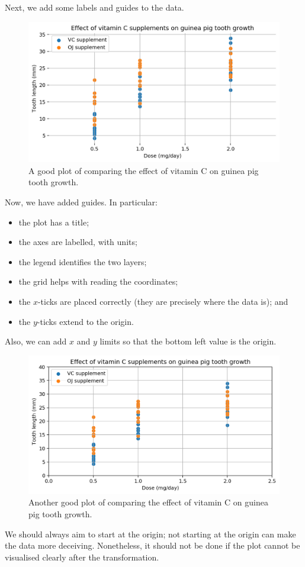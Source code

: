 \documentclass[a4paper, openany]{memoir}
\begin{document}
Next, we add some labels and guides to the data.
\begin{figure}[H]
    \centering
    \includegraphics[scale=0.5]{src/2.13 VitC Example Plot 3.png}
    \caption{A good plot of comparing the effect of vitamin C on guinea pig tooth growth.}
\end{figure}
Now, we have added guides. In particular:
\begin{itemize}
    \item the plot has a title;
    \item the axes are labelled, with units;
    \item the legend identifies the two layers;
    \item the grid helps with reading the coordinates;
    \item the $x$-ticks are placed correctly (they are precisely where the data is); and
    \item the $y$-ticks extend to the origin.
\end{itemize}

Also, we can add $x$ and $y$ limits so that the bottom left value is the origin.
\begin{figure}[H]
    \centering
    \includegraphics[scale=0.5]{src/2.14 VitC Example Plot 4.png}
    \caption{Another good plot of comparing the effect of vitamin C on guinea pig tooth growth.}
\end{figure}
We should always aim to start at the origin; not starting at the origin can make the data more deceiving. Nonetheless, it should not be done if the plot cannot be visualised clearly after the transformation.
\end{document}
